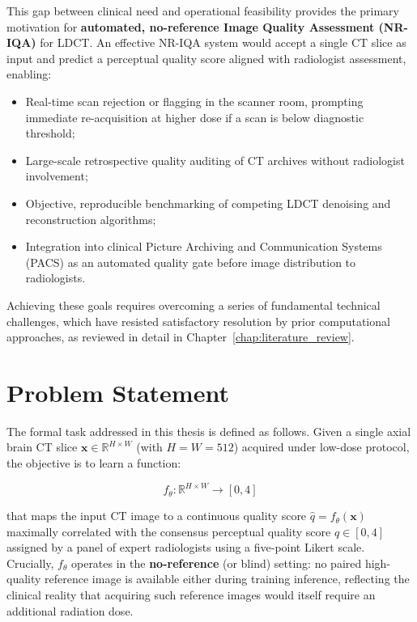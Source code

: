 This gap between clinical need and operational feasibility provides the primary motivation
for \textbf{automated, no-reference Image Quality Assessment (NR-IQA)} for LDCT. An
effective NR-IQA system would accept a single CT slice as input and predict a
perceptual quality score aligned with radiologist assessment, enabling:

\begin{itemize}
    \item Real-time scan rejection or flagging in the scanner room, prompting immediate
          re-acquisition at higher dose if a scan is below diagnostic threshold;
    \item Large-scale retrospective quality auditing of CT archives without radiologist
          involvement;
    \item Objective, reproducible benchmarking of competing LDCT denoising and
          reconstruction algorithms;
    \item Integration into clinical Picture Archiving and Communication Systems (PACS)
          as an automated quality gate before image distribution to radiologists.
\end{itemize}

Achieving these goals requires overcoming a series of fundamental technical challenges,
which have resisted satisfactory resolution by prior computational approaches, as reviewed
in detail in Chapter~\ref{chap:literature_review}.

\section{Problem Statement}
\label{sec:intro_problem}

The formal task addressed in this thesis is defined as follows. Given a single axial brain
CT slice $\mathbf{x} \in \mathbb{R}^{H \times W}$ (with $H = W = 512$) acquired under
low-dose protocol, the objective is to learn a function:

\begin{equation}
    f_\theta : \mathbb{R}^{H \times W} \rightarrow [0, 4]
\end{equation}

that maps the input CT image to a continuous quality score $\hat{q} = f_\theta(\mathbf{x})$
maximally correlated with the consensus perceptual quality score $q \in [0, 4]$ assigned
by a panel of expert radiologists using a five-point Likert scale. Crucially, $f_\theta$
operates in the \textbf{no-reference} (or blind) setting: no paired high-quality reference
image is available either during training inference, reflecting the clinical reality that
acquiring such reference images would itself require an additional radiation dose.

